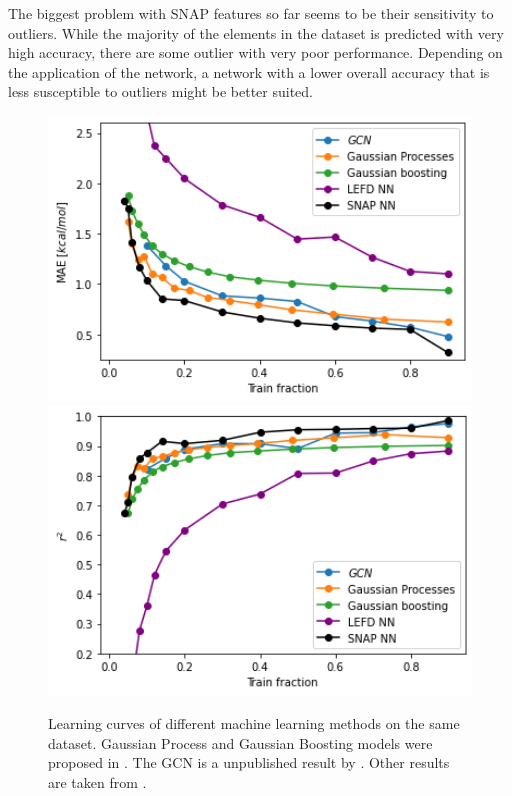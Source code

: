 The biggest problem with SNAP features so far seems to be their sensitivity to outliers.
While the majority of the elements in the dataset is predicted with very high accuracy, 
there are some outlier with very poor performance.
Depending on the application of the network, a network with a lower overall accuracy 
that is less susceptible to outliers might be better suited.

\begin{figure}[!htb]
    \includegraphics[width=1.0\textwidth]{figures/regression/mae-compare.png}
  \endminipage\hfill
  \includegraphics[width=1.0\textwidth]{figures/regression/r2-compare.png}
  \endminipage\hfill  
  \caption[Comparison of learning curves]{
    Learning curves of different machine learning methods on the same dataset.
    Gaussian Process and Gaussian Boosting models were proposed in \cite{friederich_dos}.
    The GCN is a unpublished result by \citeauthor{friederich_dos}.
    Other results are taken from \cite{friederich_dos}.
  }
  \label{fig:snap_roation}

\end{figure}



